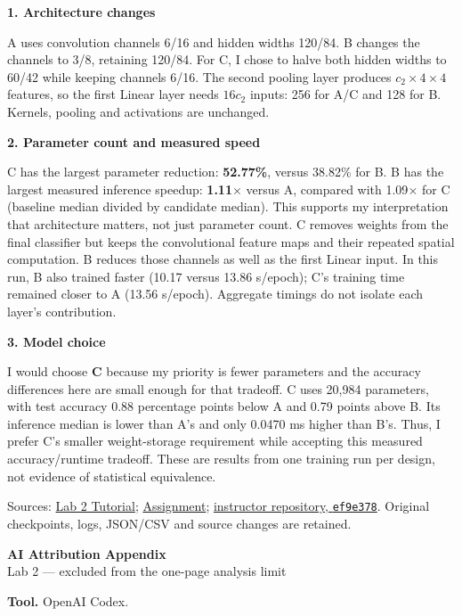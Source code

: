 \documentclass[11pt,letterpaper]{article}
\newcommand{\topic}[1]{\par\smallskip\textbf{#1}\par\nopagebreak}
\begin{document}
\topic{1. Architecture changes}
A uses convolution channels 6/16 and hidden widths 120/84. B changes the channels to 3/8, retaining 120/84. For C, I chose to halve both hidden widths to 60/42 while keeping channels 6/16. The second pooling layer produces $c_2\times4\times4$ features, so the first Linear layer needs $16c_2$ inputs: 256 for A/C and 128 for B. Kernels, pooling and activations are unchanged.

\topic{2. Parameter count and measured speed}
C has the largest parameter reduction: \textbf{52.77\%}, versus 38.82\% for B. B has the largest measured inference speedup: \textbf{1.11$\times$} versus A, compared with 1.09$\times$ for C (baseline median divided by candidate median). This supports my interpretation that architecture matters, not just parameter count. C removes weights from the final classifier but keeps the convolutional feature maps and their repeated spatial computation. B reduces those channels as well as the first Linear input. In this run, B also trained faster (10.17 versus 13.86 s/epoch); C's training time remained closer to A (13.56 s/epoch). Aggregate timings do not isolate each layer's contribution.

\topic{3. Model choice}
I would choose \textbf{C} because my priority is fewer parameters and the accuracy differences here are small enough for that tradeoff. C uses 20,984 parameters, with test accuracy 0.88 percentage points below A and 0.79 points above B. Its inference median is lower than A's and only 0.0470 ms higher than B's. Thus, I prefer C's smaller weight-storage requirement while accepting this measured accuracy/runtime tradeoff. These are results from one training run per design, not evidence of statistical equivalence.

\vfill
{\footnotesize Sources: \href{https://canvas.nd.edu/courses/144914/files/6808481?wrap=1}{Lab 2 Tutorial}; \href{https://canvas.nd.edu/courses/144914/files/6808482?wrap=1}{Assignment}; \href{https://github.com/guoyb17/CSE60685-FA26-Lab-2/tree/ef9e3787250eb3dfef7a14a3e79821c55a302256}{instructor repository, \texttt{ef9e378}}. Original checkpoints, logs, JSON/CSV and source changes are retained.}

\newpage
\begin{center}
{\Large\bfseries AI Attribution Appendix}\\[4pt]
Lab 2 --- excluded from the one-page analysis limit
\end{center}

\textbf{Tool.} OpenAI Codex.
\end{document}
